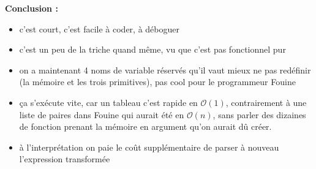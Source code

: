 \documentclass[a4paper,10pt]{report}
\begin{document}
\textbf{Conclusion :}  
  
\begin{itemize}
\item c'est court, c'est facile à coder, à déboguer
\item c'est un peu de la triche quand même, vu que c'est pas fonctionnel pur
\item on a maintenant 4 noms de variable réservés qu'il vaut mieux ne pas redéfinir (la mémoire et les trois primitives), pas cool pour le programmeur Fouine
\item ça s'exécute vite, car un tableau c'est rapide en $\mathcal{O}(1)$, contrairement à une liste de paires dans Fouine qui aurait été en $\mathcal{O}(n)$, sans parler des dizaines de fonction prenant la mémoire en argument qu'on aurait dû créer.
\item à l'interprétation on paie le coût supplémentaire de parser à nouveau l'expression transformée
\end{itemize}
\end{document}
